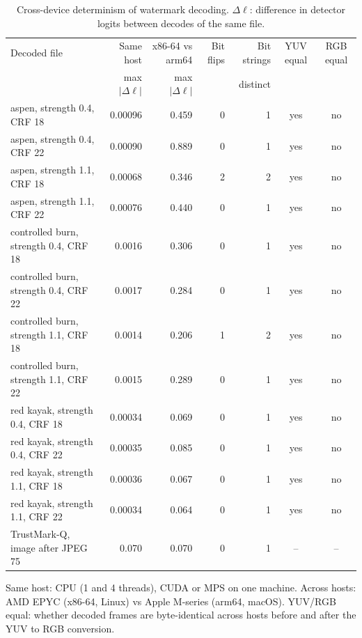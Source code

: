 \begin{table}[!t]
\centering
\footnotesize
\caption{Cross-device determinism of watermark decoding. $\Delta\ell$: difference in detector logits between decodes of the same file.}
\label{tab:stability}
\setlength{\tabcolsep}{3.4pt}
\begin{tabular}{lrrrrcc}
\toprule
Decoded file & Same host & x86-64 vs arm64 & Bit flips & Bit strings & YUV equal & RGB equal \\
  & max $|\Delta\ell|$ & max $|\Delta\ell|$ &   & distinct &   &   \\
\midrule
aspen, strength 0.4, CRF 18 & 0.00096 & 0.459 & 0 & 1 & yes & no \\
aspen, strength 0.4, CRF 22 & 0.00090 & 0.889 & 0 & 1 & yes & no \\
aspen, strength 1.1, CRF 18 & 0.00068 & 0.346 & 2 & 2 & yes & no \\
aspen, strength 1.1, CRF 22 & 0.00076 & 0.440 & 0 & 1 & yes & no \\
controlled burn, strength 0.4, CRF 18 & 0.0016 & 0.306 & 0 & 1 & yes & no \\
controlled burn, strength 0.4, CRF 22 & 0.0017 & 0.284 & 0 & 1 & yes & no \\
controlled burn, strength 1.1, CRF 18 & 0.0014 & 0.206 & 1 & 2 & yes & no \\
controlled burn, strength 1.1, CRF 22 & 0.0015 & 0.289 & 0 & 1 & yes & no \\
red kayak, strength 0.4, CRF 18 & 0.00034 & 0.069 & 0 & 1 & yes & no \\
red kayak, strength 0.4, CRF 22 & 0.00035 & 0.085 & 0 & 1 & yes & no \\
red kayak, strength 1.1, CRF 18 & 0.00036 & 0.067 & 0 & 1 & yes & no \\
red kayak, strength 1.1, CRF 22 & 0.00034 & 0.064 & 0 & 1 & yes & no \\
TrustMark-Q, image after JPEG 75 & 0.070 & 0.070 & 0 & 1 & -- & -- \\
\bottomrule
\end{tabular}
\par\vspace{2pt}\parbox{\linewidth}{\raggedright\scriptsize Same host: CPU (1 and 4 threads), CUDA or MPS on one machine. Across hosts: AMD EPYC (x86-64, Linux) vs Apple M-series (arm64, macOS). YUV/RGB equal: whether decoded frames are byte-identical across hosts before and after the YUV to RGB conversion.}
\end{table}
